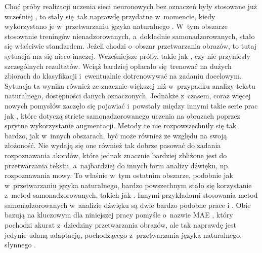Choć próby realizacji uczenia sieci neuronowych bez oznaczeń były stosowane już wcześniej \cite{noroozi_unsupervised_2017}, to stały się tak naprawdę przydatne w~momencie, kiedy wykorzystano je w~przetwarzaniu języka naturalnego \cite{devlin_bert_2019}. W~tym obszarze stosowanie treningów nienadzorowanych, a~dokładnie samonadzorowanych, stało się właściwie standardem. Jeżeli chodzi o~obszar przetwarzania obrazów, to tutaj sytuacja ma się nieco inaczej. Wcześniejsze próby, takie jak \cite{pathak_context_2016}, czy \cite{noroozi_unsupervised_2017} nie przyniosły szczególnych rezultatów. Wciąż bardziej opłacało się trenować na dużych zbiorach do klasyfikacji i~ewentualnie dotrenowywać na zadaniu docelowym. Sytuacja ta wynika również ze znacznie większej niż w~przypadku analizy tekstu naturalnego, dostępności danych oznaczonych. Jednakże z~czasem, coraz więcej nowych pomysłów zaczęło się pojawiać i~powstały między innymi takie serie prac jak \cite{chen_simple_2020, grill_bootstrap_2020, caron_unsupervised_2021, caron_emerging_2021}, które dotyczą stricte samonadzorowanego uczenia na obrazach poprzez sprytne wykorzystanie augmentacji. Metody te nie rozpowszechniły się tak bardzo, jak w~innych obszarach, być może również ze względu na swoją złożoność. Nie wydają się one również tak dobrze pasować do zadania rozpoznawania akordów, które jednak znacznie bardziej zbliżone jest do przetwarzania tekstu, a~najbardziej do innych form analizy dźwięku, np. rozpoznawania mowy. To właśnie w~tym ostatnim obszarze, podobnie jak w~przetwarzaniu języka naturalnego, bardzo powszechnym stało się korzystanie z~metod samonadzorowanych, takich jak \cite{baevski_wav2vec_2020}. Innymi przykładami stosowania metod samonadzorowanych w~analizie dźwięku są dwie bardzo podobne prace \cite{baade_mae-ast_2022} i \cite{he_masked_2021}. Obie bazują na kluczowym dla niniejszej pracy pomyśle o~nazwie MAE \cite{he_masked_2021}, który pochodzi akurat z~dziedziny przetwarzania obrazów, ale tak naprawdę jest jedynie udaną adaptacją, pochodzącego z~przetwarzania języka naturalnego, słynnego \cite{devlin_bert_2019}.

